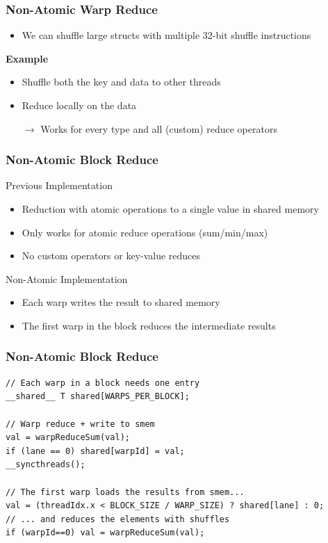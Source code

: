 \documentclass[aspectratio=169]{beamer}
\begin{document}
\frame
{	
	\frametitle{Non-Atomic Warp Reduce}

	\begin{itemize}
		\item We can shuffle large structs with multiple 32-bit shuffle instructions
	\end{itemize}
	\textbf{Example}
	\begin{itemize}
	\item Shuffle both the key and data to other threads
	\item Reduce locally on the data
	\item[$\rightarrow$] Works for every type and all (custom) reduce operators
	
\end{itemize}	

}

\begin{frame}[fragile]
\frametitle{Non-Atomic Block Reduce}
Previous Implementation
\begin{itemize}
	\item Reduction with atomic operations to a single value in shared memory
		\item<2->[$\rightarrow$] Only works for atomic reduce operations (sum/min/max)
		\item<3->[$\rightarrow$] No custom operators or key-value reduces
\end{itemize}
Non-Atomic Implementation
\begin{itemize}
	\item<5-> Each warp writes the result to shared memory
	\item<6-> The first warp in the block reduces the intermediate results 
\end{itemize}



\end{frame}


\begin{frame}[fragile]
\frametitle{Non-Atomic Block Reduce}
\label{sl:nabr}

\begin{lstlisting}
// Each warp in a block needs one entry
__shared__ T shared[WARPS_PER_BLOCK];

// Warp reduce + write to smem
val = warpReduceSum(val);
if (lane == 0) shared[warpId] = val;
__syncthreads();

// The first warp loads the results from smem...
val = (threadIdx.x < BLOCK_SIZE / WARP_SIZE) ? shared[lane] : 0;
// ... and reduces the elements with shuffles
if (warpId==0) val = warpReduceSum(val); 
\end{lstlisting}
\end{frame}
\end{document}
